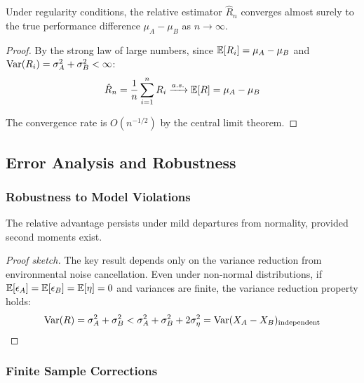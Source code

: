 \begin{theorem}
\label{thm:almost_sure_convergence}
Under regularity conditions, the relative estimator $\hat{R}_n$ converges almost surely to the true performance difference $\mu_A - \mu_B$ as $n \to \infty$.
\end{theorem}

\begin{proof}
By the strong law of large numbers, since $\operatorname{\mathbb{E}}[R_i] = \mu_A - \mu_B$ and $\operatorname{Var}(R_i) = \sigma_A^2 + \sigma_B^2 < \infty$:
\begin{equation}
\hat{R}_n = \frac{1}{n}\sum_{i=1}^n R_i \xrightarrow{a.s.} \operatorname{\mathbb{E}}[R] = \mu_A - \mu_B
\end{equation}

The convergence rate is $O(n^{-1/2})$ by the central limit theorem.
\end{proof}

\subsection{Error Analysis and Robustness}

\subsubsection{Robustness to Model Violations}

\begin{theorem}
\label{thm:robustness_non_normality}
The relative advantage persists under mild departures from normality, provided second moments exist.
\end{theorem}

\begin{proof}[Proof sketch]
The key result depends only on the variance reduction from environmental noise cancellation. Even under non-normal distributions, if $\operatorname{\mathbb{E}}[\epsilon_A] = \operatorname{\mathbb{E}}[\epsilon_B] = \operatorname{\mathbb{E}}[\eta] = 0$ and variances are finite, the variance reduction property holds:
\begin{equation}
\operatorname{Var}(R) = \sigma_A^2 + \sigma_B^2 < \sigma_A^2 + \sigma_B^2 + 2\sigma_\eta^2 = \operatorname{Var}(X_A - X_B)_{\text{independent}}
\end{equation}
\end{proof}

\subsubsection{Finite Sample Corrections}

